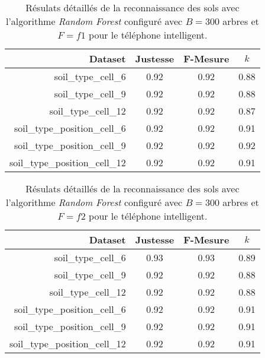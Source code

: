 \begin{table}[H]\renewcommand{\arraystretch}{0.5}
	\centering
	\caption{Résulats détaillés de la reconnaissance des sols avec l'algorithme \textit{Random Forest} configuré avec $B=300$ arbres et $F=f1$ pour le téléphone intelligent.}
	\label{tab:rf-300-f1-cell}
	\begin{tabular}{@{}rccc@{}}
		\toprule
			\textbf{Dataset} & \textbf{Justesse} & \textbf{F-Mesure} & \textbf{$k$} \\
		\midrule
			soil\_type\_cell\_6 & 0.92 & 0.92 & 0.88 \\
			soil\_type\_cell\_9 & 0.92 & 0.92 & 0.88 \\
			soil\_type\_cell\_12 & 0.92 & 0.92 & 0.87 \\
			soil\_type\_position\_cell\_6 & 0.92 & 0.92 & 0.91 \\
			soil\_type\_position\_cell\_9 & 0.92 & 0.92 & 0.92 \\
			soil\_type\_position\_cell\_12 & 0.92 & 0.92 & 0.91 \\
		\bottomrule
	\end{tabular}
\end{table}

\begin{table}[H]\renewcommand{\arraystretch}{0.5}
	\centering
	\caption{Résulats détaillés de la reconnaissance des sols avec l'algorithme \textit{Random Forest} configuré avec $B=300$ arbres et $F=f2$ pour le téléphone intelligent.}
	\label{tab:rf-300-f2-cell}
	\begin{tabular}{@{}rccc@{}}
		\toprule
			\textbf{Dataset} & \textbf{Justesse} & \textbf{F-Mesure} & \textbf{$k$} \\
		\midrule
			soil\_type\_cell\_6 & 0.93 & 0.93 & 0.89 \\
			soil\_type\_cell\_9 & 0.92 & 0.92 & 0.88 \\
			soil\_type\_cell\_12 & 0.92 & 0.92 & 0.88 \\
			soil\_type\_position\_cell\_6 & 0.92 & 0.92 & 0.91 \\
			soil\_type\_position\_cell\_9 & 0.92 & 0.92 & 0.91 \\
			soil\_type\_position\_cell\_12 & 0.92 & 0.92 & 0.91 \\
		\bottomrule
	\end{tabular}
\end{table}

